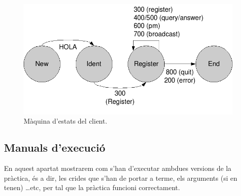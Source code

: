 \documentclass[a4paper,10pt]{article}
\begin{document}
		\begin{figure}[h]
		\begin{center}
		\includegraphics[scale=0.5]{automat.png}
		\caption{Màquina d'estats del client.}
		\label{estat}
		\end{center}
		\end{figure}

	\subsection{Manuals d'execució}
	En aquest apartat mostrarem com s'han d'executar ambdues versions de la pràctica, és a dir, les crides que s'han de portar a terme, els arguments (si en tenen) \ldots etc, per tal que la pràctica funcioni correctament.
\end{document}
